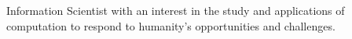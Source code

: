 \begin{cvparagraph}

Information Scientist with an interest in the study and applications of computation to respond to humanity's opportunities and challenges.
\end{cvparagraph}
